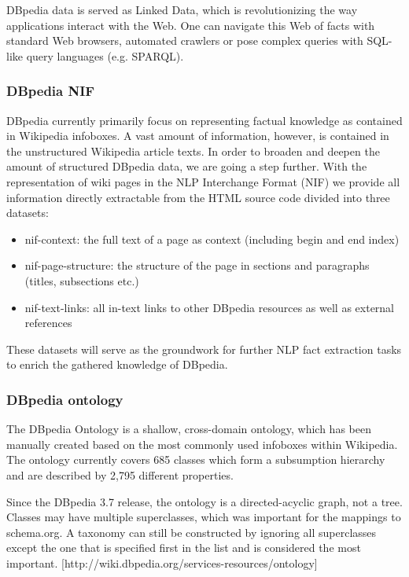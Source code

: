 \documentclass[thesis=M,english]{FITthesis}[2018/05/30]
\begin{document}
	DBpedia data is served as Linked Data, which is revolutionizing the way applications interact with the Web. One can navigate this Web of facts with standard Web browsers, automated crawlers or pose complex queries with SQL-like query languages (e.g. SPARQL).

\subsubsection{DBpedia NIF}\label{DBpediaNIF}
DBpedia \cite{dbpedia:NIF} currently primarily focus on representing factual knowledge as contained in Wikipedia infoboxes. A vast amount of information, however, is contained in the unstructured Wikipedia article texts. In order to broaden and deepen the amount of structured DBpedia data, we are going a step further.
With the representation of wiki pages in the NLP Interchange Format (NIF) we provide all information directly extractable from the HTML source code divided into three datasets:
\begin{itemize}
\item nif-context: the full text of a page as context (including begin and end index)
\item nif-page-structure: the structure of the page in sections and paragraphs (titles, subsections etc.)
\item nif-text-links: all in-text links to other DBpedia resources as well as external references
\end{itemize}
These datasets will serve as the groundwork for further NLP fact extraction tasks to enrich the gathered knowledge of DBpedia.


\subsubsection{DBpedia ontology}\label{DBpediaOntology}
The DBpedia Ontology is a shallow, cross-domain ontology, which has been manually created based on the most commonly used infoboxes within Wikipedia. The ontology currently covers 685 classes which form a subsumption hierarchy and are described by 2,795 different properties.

Since the DBpedia 3.7 release, the ontology is a directed-acyclic graph, not a tree. Classes may have multiple superclasses, which was important for the mappings to schema.org. A taxonomy can still be constructed by ignoring all superclasses except the one that is specified first in the list and is considered the most important. [http://wiki.dbpedia.org/services-resources/ontology]
\end{document}
